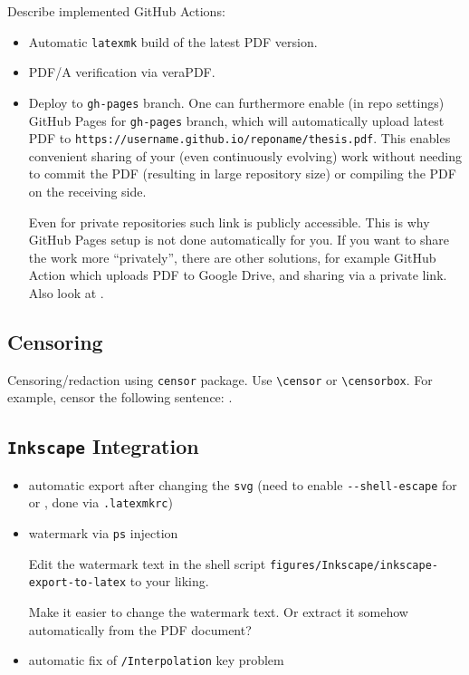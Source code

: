 Describe implemented GitHub Actions:
\begin{itemize}
    \item Automatic \texttt{latexmk} build of the latest PDF version.
    \item PDF/A verification via veraPDF.
    \item Deploy to \texttt{gh-pages} branch.
          One can furthermore enable (in repo settings) GitHub Pages for \texttt{gh-pages} branch, which will automatically upload latest PDF to \texttt{https://username.github.io/reponame/thesis.pdf}.
          This enables convenient sharing of your (even continuously evolving) work without needing to commit the PDF (resulting in large repository size) or compiling the PDF on the receiving side.
          \begin{remark}
              Even for private repositories such link is publicly accessible.
              This is why GitHub Pages setup is not done automatically for you.
              If you want to share the work more \enquote{privately}, there are other solutions, for example GitHub Action which uploads PDF to Google Drive, and sharing via a private link.
              Also look at .
          \end{remark}
\end{itemize}

\subsection{Censoring}%
\label{sub:Censoring}

Censoring/redaction using \texttt{censor} package.
Use \verb|\censor| or \verb|\censorbox|.
For example, censor the following sentence: .

\subsection{\texorpdfstring{\texttt{Inkscape}}{Inkscape} Integration}%
\label{sub:Inkscape Integration}

\begin{itemize}
    \item automatic export after changing the \texttt{svg} (need to enable \verb|--shell-escape| for  or , done via \texttt{.latexmkrc})
    \item watermark via \texttt{ps} injection
          \begin{remark}
              Edit the watermark text in the shell script \verb|figures/Inkscape/inkscape-export-to-latex| to your liking.
          \end{remark}
          \begin{Todo}
              Make it easier to change the watermark text.
              Or extract it somehow automatically from the PDF document?
          \end{Todo}
    \item automatic fix of \texttt{/Interpolation} key problem
\end{itemize}


